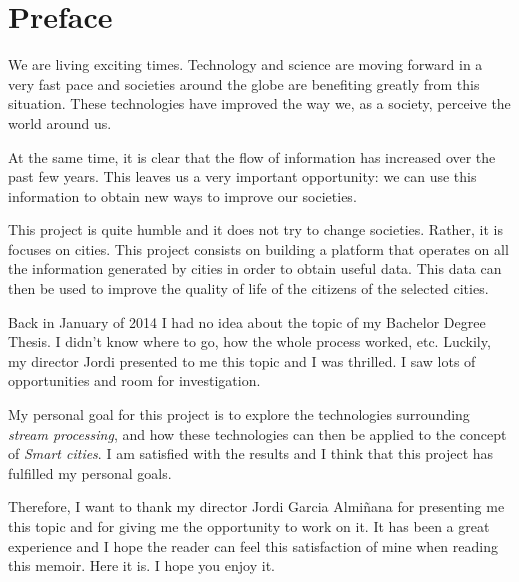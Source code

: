 
\chapter{Preface}

We are living exciting times. Technology and science are moving forward in a
very fast pace and societies around the globe are benefiting greatly from this
situation. These technologies have improved the way we, as a society, perceive
the world around us.

At the same time, it is clear that the flow of information has increased over
the past few years. This leaves us a very important opportunity: we can use this
information to obtain new ways to improve our societies.

This project is quite humble and it does not try to change societies. Rather,
it is focuses on cities. This project consists on building a platform that
operates on all the information generated by cities in order to obtain useful
data. This data can then be used to improve the quality of life of the
citizens of the selected cities.

Back in January of 2014 I had no idea about the topic of my Bachelor Degree
Thesis. I didn't know where to go, how the whole process worked, etc. Luckily,
my director Jordi presented to me this topic and I was thrilled. I saw lots of
opportunities and room for investigation.

My personal goal for this project is to explore the technologies surrounding
{\it stream processing}, and how these technologies can then be applied to the
concept of {\it Smart cities}. I am satisfied with the results and I think that
this project has fulfilled my personal goals.

Therefore, I want to thank my director Jordi Garcia Almiñana for presenting
me this topic and for giving me the opportunity to work on it. It has been a
great experience and I hope the reader can feel this satisfaction of mine when
reading this memoir. Here it is. I hope you enjoy it.
